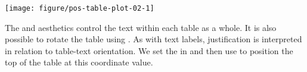 \documentclass[krantz2]{krantz}\usepackage{knitr}%
\begin{document}
\begin{knitrout}\footnotesize
{}\color{fgcolor}\begin{kframe}
\begin{alltt}
\hlstd{(}  \hlstd{(}   
                           \hlstd{=} 
                           
                            \hlopt{+}
  \hlstd{()} \hlopt{+}
  \hlstd{()} \hlopt{+}
  \hlstd{(} \hlstd{=} \hlstd{,}  \hlstd{=} \hlstd{)} \hlopt{+}
  \hlstd{(} 
             \hlstd{(}     
              \hlstd{=} \hlstd{,}  \hlstd{=} \hlstd{,}  \hlstd{=} \hlstd{,}  \hlstd{=} \hlstd{)}
\end{alltt}
\end{kframe}

{\centering \texttt{[image: figure/pos-table-plot-02-1]} 

}



\end{knitrout}

The  and  aesthetics control the text within each table as a whole.
It is also possible to rotate the table using . As with text labels, justification is interpreted in relation to table-text orientation. We set the  in  and then use  to position the top of the
table at this coordinate value.
\end{document}
